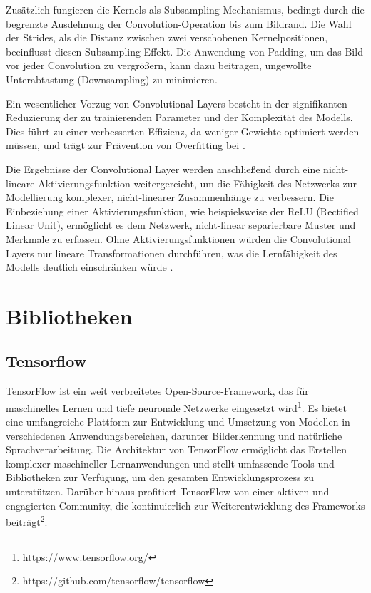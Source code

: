 Zusätzlich fungieren die Kernels als Subsampling-Mechanismus, bedingt durch die begrenzte Ausdehnung der Convolution-Operation bis zum Bildrand. Die Wahl der Strides, als die Distanz zwischen zwei verschobenen Kernelpositionen, beeinflusst diesen Subsampling-Effekt. Die Anwendung von Padding, um das Bild vor jeder Convolution zu vergrößern, kann dazu beitragen, ungewollte Unterabtastung (Downsampling) zu minimieren.

Ein wesentlicher Vorzug von Convolutional Layers besteht in der signifikanten Reduzierung der zu trainierenden Parameter und der Komplexität des Modells. Dies führt zu einer verbesserten Effizienz, da weniger Gewichte optimiert werden müssen, und trägt zur Prävention von Overfitting bei \cite{Yamashita.2018,OShea.2015}.

Die Ergebnisse der Convolutional Layer werden anschließend durch eine nicht-lineare Aktivierungsfunktion weitergereicht, um die Fähigkeit des Netzwerks zur Modellierung komplexer, nicht-linearer Zusammenhänge zu verbessern. Die Einbeziehung einer Aktivierungsfunktion, wie beispielsweise der ReLU (Rectified Linear Unit), ermöglicht es dem Netzwerk, nicht-linear separierbare Muster und Merkmale zu erfassen. Ohne Aktivierungsfunktionen würden die Convolutional Layers nur lineare Transformationen durchführen, was die Lernfähigkeit des Modells deutlich einschränken würde \cite{Sharma.2017}.

\section{Bibliotheken}
\subsection{Tensorflow}
TensorFlow ist ein weit verbreitetes Open-Source-Framework, das für maschinelles Lernen und tiefe neuronale Netzwerke eingesetzt wird\footnote{https://www.tensorflow.org/}. Es bietet eine umfangreiche Plattform zur Entwicklung und Umsetzung von Modellen in verschiedenen Anwendungsbereichen, darunter Bilderkennung und natürliche Sprachverarbeitung. Die Architektur von TensorFlow ermöglicht das Erstellen komplexer maschineller Lernanwendungen und stellt umfassende Tools und Bibliotheken zur Verfügung, um den gesamten Entwicklungsprozess zu unterstützen. Darüber hinaus profitiert TensorFlow von einer aktiven und engagierten Community, die kontinuierlich zur Weiterentwicklung des Frameworks beiträgt\footnote{https://github.com/tensorflow/tensorflow}.

